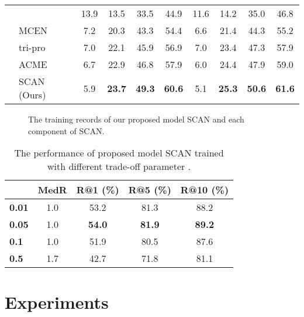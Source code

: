 \documentclass[journal]{IEEEtran}
\begin{document}
\begin{table*}[h!]
\begin{tabular}{clcccccccc}
    & \cite{zhu2019r2gan} & 13.9 & 13.5 & 33.5 & 44.9 & 11.6 & 14.2 & 35.0 & 46.8 \\
    &MCEN \cite{fu2020mcen} & 7.2 & 20.3 & 43.3 & 54.4 & 6.6 & 21.4 & 44.3 & 55.2 \\
    &tri-pro \cite{zan2020sentence} & 7.0 & 22.1 & 45.9 & 56.9 & 7.0 & 23.4 & 47.3 & 57.9 \\
    &ACME \cite{wang2019learning} & 6.7 & 22.9 & 46.8 & 57.9 & 6.0 & 24.4 & 47.9 & 59.0 \\
    & SCAN (Ours) & 5.9 & \textbf{23.7} & \textbf{49.3} & \textbf{60.6} & 5.1 & \textbf{25.3} & \textbf{50.6} & \textbf{61.6}\\
    \bottomrule
  \end{tabular}
  \label{tab:results}
\end{table*}

\begin{figure*}[h!]
\begin{center}
\end{center}
\caption{The training records of our proposed model SCAN and each component of SCAN.}
\label{fig:training}
\end{figure*}

\begin{table}
  \centering
  \caption{The performance of proposed model SCAN trained with different trade-off parameter .}
    \begin{tabular}{lcccc}
    \toprule
    {} & \textbf{MedR} & \textbf{R@1 (\%)} & \textbf{R@5 (\%)} & \textbf{R@10 (\%)} \\
    \midrule
    \textbf{0.01} & 1.0 & 53.2 & 81.3  & 88.2 \\
    \textbf{0.05} & 1.0 & \textbf{54.0}  & \textbf{81.9}  & \textbf{89.2} \\
    \textbf{0.1} & 1.0 & 51.9  & 80.5  & 87.6 \\
    \textbf{0.5} & 1.7 & 42.7  & 71.8  & 81.1 \\
    \bottomrule
    \end{tabular}\label{tab:parameter}\end{table}

\section{Experiments}
\end{document}
